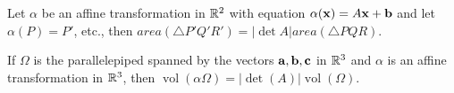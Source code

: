 \begin{theorem}
    \begin{statements}{}
        \item Let \(\alpha\) be an affine transformation in \(\mathbb{R}^2\) with equation \(\alpha(\mathbf{x}) = A\mathbf{x} + \mathbf{b}\) and let \(\alpha(P) = P'\), etc., then \(area(\triangle P'Q'R') = |\det A|area(\triangle PQR)\).
        \item If \(\Omega\) is the parallelepiped spanned by the vectors \(\mathbf{a}, \mathbf{b}, \mathbf{c}\) in \(\mathbb{R}^3\) and \(\alpha\) is an affine transformation in \(\mathbb{R}^3\), then \(\operatorname{vol}(\alpha \Omega) = |\det(A)|\operatorname{vol}(\Omega)\).
    \end{statements}
\end{theorem}

\pagebreak